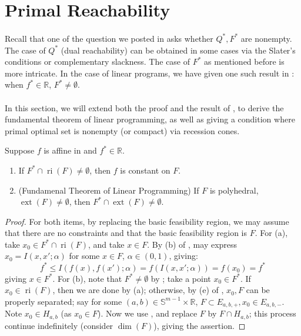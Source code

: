 \section{Primal Reachability}
\label{sect:045}

\paragraph{}Recall that one of the question we posted in  asks whether $Q^\ast,F^\ast$ are nonempty. The case of $Q^\ast$ (dual reachability) can be obtained in some cases via the Slater's conditions or complementary slackness. The case of $F^\ast$ as mentioned before is more intricate. In the case of linear programs, we have given one such result in : when $f^\ast\in \mathbb{R}$, $F^\ast\neq\emptyset$.

\paragraph{}In this section, we will extend both the proof and the result of , to derive the fundamental theorem of linear programming, as well as giving a condition where primal optimal set is nonempty (or compact) via recession cones.

\begin{prop}\label{prop:045-linear-primal-optimality}
	Suppose $f$ is affine in  and $f^\ast\in \mathbb{R}$.
	\begin{enumerate}[label=(\alph*)]
		\item If $F^\ast \cap \operatorname{ri}(F)\neq\emptyset$, then $f$ is constant on $F$.
		\item (Fundamenal Theorem of Linear Programming) If $F$ is polyhedral, $\operatorname{ext}(F)\neq\emptyset$, then $F^\ast\cap\operatorname{ext}(F)\neq\emptyset$.
	\end{enumerate}
\end{prop}

\begin{proof}
	For both items, by replacing the basic feasibility region, we may assume that there are no constraints and that the basic feasibility region is $F$. For (a), take $x_0\in F^\ast \cap \operatorname{ri}(F)$, and take $x\in F$. By (b) of , may express $x_0=I(x,x'; \alpha )$ for some $x\in F$, $\alpha \in (0,1)$, giving:
	\[
		f^\ast \leq I(f(x),f(x');\alpha )=f(I(x,x';\alpha ))=f(x_0)=f^\ast
	\]
	giving $x\in F^\ast$. For (b), note that $F^\ast\neq\emptyset$ by ; take a point $x_0\in F^\ast$. If $x_0\in \operatorname{ri}(F)$, then we are done by (a); otherwise, by (e) of , $x_0, F$ can be properly separated; say for some $(a,b)\in \mathbb{S}^{m-1}\times \mathbb{R}$, $F\subset E_{a,b,+},x_0\in E_{a,b,-}$. Note $x_0\in H_{a,b}$ (as $x_0\in F$). Now we use , and replace $F$ by $F\cap H_{a,b}$; this process continue indefinitely (consider $\dim(F)$), giving the assertion.
\end{proof}

